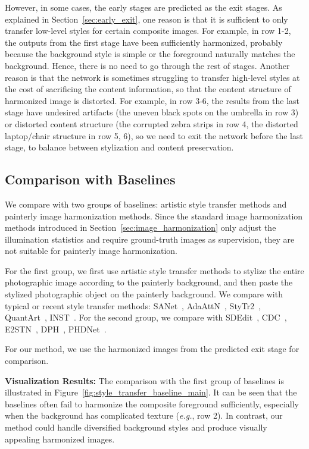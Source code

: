 \documentclass[letterpaper]{article} %
\begin{document}
However, in some cases, the early stages are predicted as the exit stages. As explained in Section~\ref{sec:early_exit},  one reason is that it is sufficient to only transfer low-level styles for certain composite images. For example, in row 1-2, the outputs from the first stage have been sufficiently harmonized, probably because the background style is simple or the foreground naturally matches the background. Hence, there is no need to go through the rest of stages.  
Another reason is that the network is sometimes struggling to transfer high-level styles at the cost of sacrificing the content information, so that the content structure of harmonized image is distorted. 
For example, in row 3-6, the results from the last stage have undesired artifacts (the uneven black spots on the umbrella in row 3) or distorted content structure (the corrupted zebra strips in row 4, the distorted laptop/chair structure in row 5, 6), so we need to exit the network before the last stage, to balance between stylization and content preservation. 



\subsection{Comparison with Baselines}
We compare with two groups of baselines: artistic style transfer methods and painterly image harmonization methods.  Since the standard image harmonization methods introduced in Section~\ref{sec:image_harmonization} only adjust the illumination statistics and require ground-truth images as supervision, they are not suitable for painterly image harmonization. 

For the first group, we first use artistic style transfer methods to stylize the entire photographic image according to the painterly background, and then paste the stylized photographic object on the painterly background.
We compare with typical or recent style transfer methods: SANet~\cite{park2019arbitrary}, AdaAttN~\cite{liu2021adaattn},  StyTr2~\cite{deng2022stytr2}, QuantArt~\cite{quantart}, INST~\cite{inst}. 
For the second group, we compare with SDEdit~\cite{sdedit}, CDC~\cite{cdc}, E2STN~\cite{peng2019element}, DPH~\cite{luan2018deep}, PHDNet~\cite{cao2022painterly}. 

For our method, we use the harmonized images from the predicted exit stage for comparison. 

\textbf{Visualization Results: }The comparison with the first group of baselines is illustrated in Figure~\ref{fig:style_transfer_baseline_main}. It can be seen that the baselines often fail to harmonize the composite foreground sufficiently, especially when the background has complicated texture (\emph{e.g.}, row 2). In contrast, our method could handle diversified background styles and produce visually appealing harmonized images.  
\end{document}
